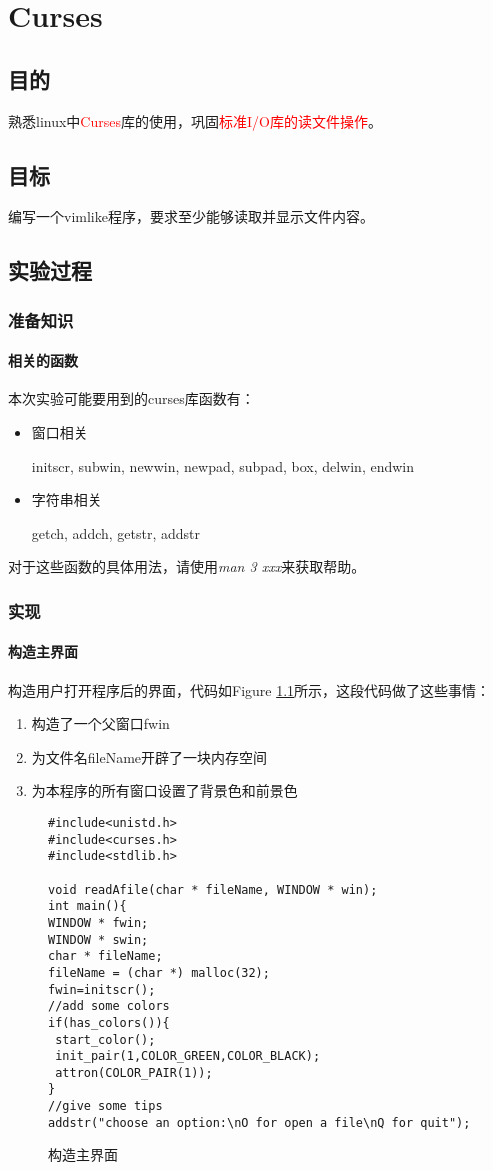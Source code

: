 \chapter{Curses}
\section{目的}
熟悉linux中\textcolor{red}{Curses}库的使用，巩固\textcolor{red}{标准I/O库的读文件操作}。
\section{目标}
编写一个vimlike程序，要求至少能够读取并显示文件内容。
\section{实验过程}
\subsection{准备知识}

\subsubsection{相关的函数}
本次实验可能要用到的curses库函数有：
\begin{itemize}
\item
窗口相关

initscr, subwin, newwin, newpad, subpad, box, delwin, endwin
\item
字符串相关

getch, addch,  getstr, addstr
\end{itemize}
对于这些函数的具体用法，请使用\emph{man 3 xxx}来获取帮助。
\subsection{实现}
\subsubsection{构造主界面}
构造用户打开程序后的界面，代码如Figure \ref{Curses_mainui}所示，这段代码做了这些事情：
\begin{enumerate}
\item
构造了一个父窗口fwin
\item
为文件名fileName开辟了一块内存空间
\item
为本程序的所有窗口设置了背景色和前景色
\end{enumerate}
\begin{figure}
\begin{lstlisting}
#include<unistd.h>
#include<curses.h>
#include<stdlib.h>

void readAfile(char * fileName, WINDOW * win);
int main(){
WINDOW * fwin;
WINDOW * swin;
char * fileName;
fileName = (char *) malloc(32);
fwin=initscr();
//add some colors
if(has_colors()){
 start_color();
 init_pair(1,COLOR_GREEN,COLOR_BLACK);
 attron(COLOR_PAIR(1));
}
//give some tips
addstr("choose an option:\nO for open a file\nQ for quit");
\end{lstlisting}
\caption{构造主界面}
\label{Curses_mainui}
\end{figure}
